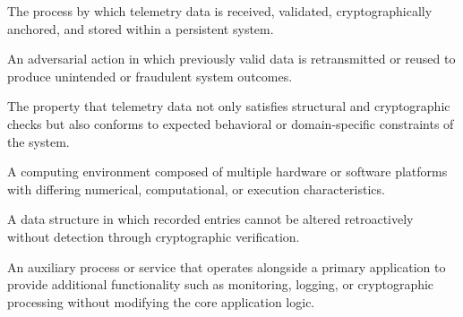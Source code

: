 \begin{definition}[Ingestion]
The process by which telemetry data is received, validated, cryptographically anchored, and stored within a persistent system.
\end{definition}

\begin{definition}
An adversarial action in which previously valid data is retransmitted or reused to produce unintended or fraudulent system outcomes.
\end{definition}

\begin{definition}
The property that telemetry data not only satisfies structural and cryptographic checks but also conforms to expected behavioral or domain-specific constraints of the system.
\end{definition}

\begin{definition}
A computing environment composed of multiple hardware or software platforms with differing numerical, computational, or execution characteristics.
\end{definition}

\begin{definition}
A data structure in which recorded entries cannot be altered retroactively without detection through cryptographic verification.
\end{definition}

\begin{definition}
An auxiliary process or service that operates alongside a primary application to provide additional functionality such as monitoring, logging, or cryptographic processing without modifying the core application logic.
\end{definition}